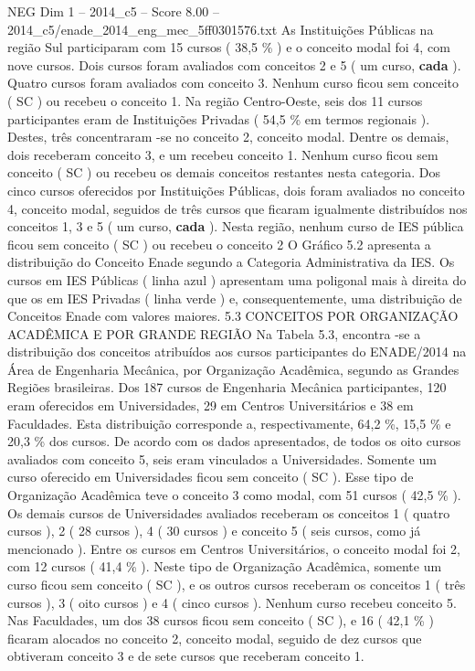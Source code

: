 \begin{textsample}{NEG Dim 1 – 2014\_c5 – Score 8.00 – 2014\_c5/enade\_2014\_eng\_mec\_5ff0301576.txt}
As Instituições Públicas na região Sul participaram com 15 cursos ( 38,5 \% ) e o conceito modal foi 4, com nove cursos.
Dois cursos foram avaliados com conceitos 2 e 5 ( um curso, \textbf{cada} ).
Quatro cursos foram avaliados com conceito 3.
Nenhum curso ficou sem conceito ( SC ) ou recebeu o conceito 1.
Na região Centro-Oeste, seis dos 11 cursos participantes eram de Instituições Privadas ( 54,5 \% em termos regionais ).
Destes, três concentraram -se no conceito 2, conceito modal.
Dentre os demais, dois receberam conceito 3, e um recebeu conceito 1.
Nenhum curso ficou sem conceito ( SC ) ou recebeu os demais conceitos restantes nesta categoria.
Dos cinco cursos oferecidos por Instituições Públicas, dois foram avaliados no conceito 4, conceito modal, seguidos de três cursos que ficaram igualmente distribuídos nos conceitos 1, 3 e 5 ( um curso, \textbf{cada} ).
Nesta região, nenhum curso de IES pública ficou sem conceito ( SC ) ou recebeu o conceito 2 O Gráfico 5.2 apresenta a distribuição do Conceito Enade segundo a Categoria Administrativa da IES.
Os cursos em IES Públicas ( linha azul ) apresentam uma poligonal mais à direita do que os em IES Privadas ( linha verde ) e, consequentemente, uma distribuição de Conceitos Enade com valores maiores. 5.3 CONCEITOS POR ORGANIZAÇÃO ACADÊMICA E POR GRANDE REGIÃO Na Tabela 5.3, encontra -se a distribuição dos conceitos atribuídos aos cursos participantes do ENADE/2014 na Área de Engenharia Mecânica, por Organização Acadêmica, segundo as Grandes Regiões brasileiras.
Dos 187 cursos de Engenharia Mecânica participantes, 120 eram oferecidos em Universidades, 29 em Centros Universitários e 38 em Faculdades.
Esta distribuição corresponde a, respectivamente, 64,2 \%, 15,5 \% e 20,3 \% dos cursos.
De acordo com os dados apresentados, de todos os oito cursos avaliados com conceito 5, seis eram vinculados a Universidades.
Somente um curso oferecido em Universidades ficou sem conceito ( SC ).
Esse tipo de Organização Acadêmica teve o conceito 3 como modal, com 51 cursos ( 42,5 \% ).
Os demais cursos de Universidades avaliados receberam os conceitos 1 ( quatro cursos ), 2 ( 28 cursos ), 4 ( 30 cursos ) e conceito 5 ( seis cursos, como já mencionado ).
Entre os cursos em Centros Universitários, o conceito modal foi 2, com 12 cursos ( 41,4 \% ).
Neste tipo de Organização Acadêmica, somente um curso ficou sem conceito ( SC ), e os outros cursos receberam os conceitos 1 ( três cursos ), 3 ( oito cursos ) e 4 ( cinco cursos ).
Nenhum curso recebeu conceito 5.
Nas Faculdades, um dos 38 cursos ficou sem conceito ( SC ), e 16 ( 42,1 \% ) ficaram alocados no conceito 2, conceito modal, seguido de dez cursos que obtiveram conceito 3 e de sete cursos que receberam conceito 1.

\end{textsample}
